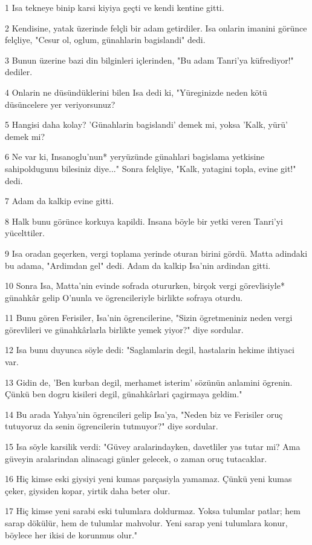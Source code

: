 \par 1 Isa tekneye binip karsi kiyiya geçti ve kendi kentine gitti.
\par 2 Kendisine, yatak üzerinde felçli bir adam getirdiler. Isa onlarin imanini görünce felçliye, "Cesur ol, oglum, günahlarin bagislandi" dedi.
\par 3 Bunun üzerine bazi din bilginleri içlerinden, "Bu adam Tanri'ya küfrediyor!" dediler.
\par 4 Onlarin ne düsündüklerini bilen Isa dedi ki, "Yüreginizde neden kötü düsüncelere yer veriyorsunuz?
\par 5 Hangisi daha kolay? 'Günahlarin bagislandi' demek mi, yoksa 'Kalk, yürü' demek mi?
\par 6 Ne var ki, Insanoglu'nun* yeryüzünde günahlari bagislama yetkisine sahipoldugunu bilesiniz diye..." Sonra felçliye, "Kalk, yatagini topla, evine git!" dedi.
\par 7 Adam da kalkip evine gitti.
\par 8 Halk bunu görünce korkuya kapildi. Insana böyle bir yetki veren Tanri'yi yücelttiler.
\par 9 Isa oradan geçerken, vergi toplama yerinde oturan birini gördü. Matta adindaki bu adama, "Ardimdan gel" dedi. Adam da kalkip Isa'nin ardindan gitti.
\par 10 Sonra Isa, Matta'nin evinde sofrada otururken, birçok vergi görevlisiyle* günahkâr gelip O'nunla ve ögrencileriyle birlikte sofraya oturdu.
\par 11 Bunu gören Ferisiler, Isa'nin ögrencilerine, "Sizin ögretmeniniz neden vergi görevlileri ve günahkârlarla birlikte yemek yiyor?" diye sordular.
\par 12 Isa bunu duyunca söyle dedi: "Saglamlarin degil, hastalarin hekime ihtiyaci var.
\par 13 Gidin de, 'Ben kurban degil, merhamet isterim' sözünün anlamini ögrenin. Çünkü ben dogru kisileri degil, günahkârlari çagirmaya geldim."
\par 14 Bu arada Yahya'nin ögrencileri gelip Isa'ya, "Neden biz ve Ferisiler oruç tutuyoruz da senin ögrencilerin tutmuyor?" diye sordular.
\par 15 Isa söyle karsilik verdi: "Güvey aralarindayken, davetliler yas tutar mi? Ama güveyin aralarindan alinacagi günler gelecek, o zaman oruç tutacaklar.
\par 16 Hiç kimse eski giysiyi yeni kumas parçasiyla yamamaz. Çünkü yeni kumas çeker, giysiden kopar, yirtik daha beter olur.
\par 17 Hiç kimse yeni sarabi eski tulumlara doldurmaz. Yoksa tulumlar patlar; hem sarap dökülür, hem de tulumlar mahvolur. Yeni sarap yeni tulumlara konur, böylece her ikisi de korunmus olur."

